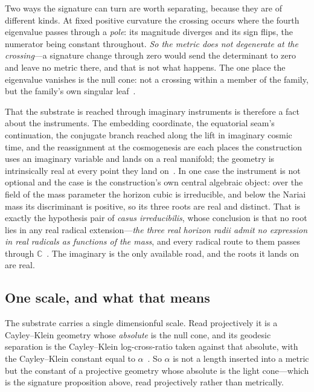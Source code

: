 \documentclass[11pt,a4paper]{article}
\theoremstyle{plain}
\theoremstyle{definition}
\begin{document}
Two ways the signature can turn are worth separating, because they are of different kinds. At fixed positive
curvature the crossing occurs where the fourth eigenvalue passes through a \emph{pole}: its magnitude
diverges and its sign flips, the numerator being constant throughout. \emph{So the metric does not degenerate
at the crossing}---a signature change through zero would send the determinant to zero and leave no metric
there, and that is not what happens. The one place the eigenvalue vanishes is the null cone: not a crossing
within a member of the family, but the family's own singular leaf~\cite{JanzenGeometricCore}.

That the substrate is reached through imaginary instruments is therefore a fact about the instruments. The
embedding coordinate, the equatorial seam's continuation, the conjugate branch reached along the lift in
imaginary cosmic time, and the reassignment at the cosmogenesis are each places the construction uses an
imaginary variable and lands on a real manifold; the geometry is
intrinsically real at every point they land on~\cite{JanzenGeometricCore}. In one case the instrument is not
optional and the case is the construction's own central algebraic object: over the field of the mass
parameter the horizon cubic is irreducible, and below the Nariai mass its discriminant is positive, so its
three roots are real and distinct. That is exactly the hypothesis pair of \emph{casus irreducibilis}, whose
conclusion is that no root lies in any real radical extension---\emph{the three real horizon radii admit no
expression in real radicals as functions of the mass}, and every radical route to them passes through
$\mathbb{C}$~\cite{JanzenGeometricCore}. The imaginary is the only available road, and the roots it lands on
are real.

\subsection{One scale, and what that means}

The substrate carries a single dimensionful scale. Read projectively it is a Cayley--Klein
geometry whose \emph{absolute} is the null cone, and its geodesic separation is the
Cayley--Klein log-cross-ratio taken against that absolute, with the Cayley--Klein constant equal to
$\alpha$~\cite{JanzenGeometricCore}. So $\alpha$ is not a length inserted into a metric but the constant of a
projective geometry whose absolute is the light cone---which is the signature proposition above, read
projectively rather than metrically.
\end{document}
